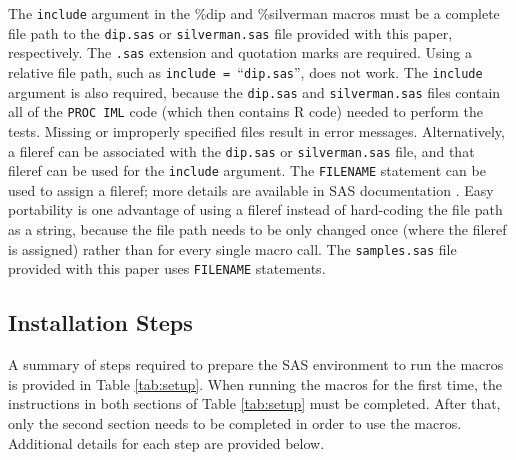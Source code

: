 \documentclass[]{interact}
\theoremstyle{plain}%
\theoremstyle{definition}
\theoremstyle{remark}
\begin{document}
The \texttt{include} argument in the \%dip and \%silverman macros must be a complete file path to the \texttt{dip.sas} or \texttt{silverman.sas} file provided with this paper, respectively.
The \texttt{.sas} extension and quotation marks are required. Using a relative file path, such as \texttt{include = }``\texttt{dip.sas}'', does not work. The \texttt{include} argument is also required, because the \texttt{dip.sas} and \texttt{silverman.sas} files contain all of the \texttt{PROC IML} code (which then contains R code) needed to perform the tests. Missing or improperly specified files result in error messages. Alternatively, a fileref can be associated with the \texttt{dip.sas} or \texttt{silverman.sas} file, and that fileref can be used for the \texttt{include} argument. The \texttt{FILENAME} statement can be used to assign a fileref; more details are available in SAS documentation \citep[p.~149]{SAS-config}. Easy portability is one advantage of using a fileref instead of hard-coding the file path as a string, because the file path needs to be only changed once (where the fileref is assigned) rather than for every single macro call. The \texttt{samples.sas} file provided with this paper uses \texttt{FILENAME} statements. 

\subsection{Installation Steps}\label{install} A summary of steps required to prepare the SAS environment to run the macros is provided in Table \ref{tab:setup}. When running the macros for the first time, the instructions in both sections of Table \ref{tab:setup} must be completed. After that, only the second section needs to be completed in order to use the macros. Additional details for each step are provided below.
\end{document}
